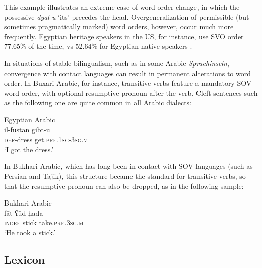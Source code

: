 \documentclass[output=paper]{langsci/langscibook}
\begin{document}

This example illustrates an extreme case of word order change, in which the possessive \textit{dyal-u} ‘its’ precedes the head. Overgeneralization of permissible (but sometimes pragmatically marked) word orders, however, occur much more frequently. Egyptian heritage speakers in the US, for instance, use SVO order 77.65\% of the time, vs 52.64\% for Egyptian native speakers \citep[280–281]{AlbiriniSaadah2011}.

In situations of stable bilingualism, such as in some Arabic \textit{Sprachinseln}, convergence with contact languages can result in permanent alterations to word order. In Buxari Arabic, for instance, transitive verbs feature a mandatory SOV word order, with optional resumptive pronoun after the verb. Cleft sentences such as the following one are quite common in all Arabic dialects:

\ea\label{ex:key:}
{Egyptian Arabic \citep[145]{Ratcliffe2005}}\\
\gll il-fustān  gibt-u\\
     \textsc{def-}dress  get.\textsc{prf.1sg-3sg.m}\\
\glt ‘I got the dress.’
\z

In Bukhari Arabic, which has long been in contact with SOV languages (such as Persian and Tajik), this structure became the standard for transitive verbs, so that the resumptive pronoun can also be dropped, as in the following sample:

\ea\label{ex:key:}
{Bukhari Arabic  \citep[144]{Ratcliffe2005}}\\
\gll   fāt ʕūd ḫada\\
       \textsc{indef} stick take\textsc{.prf.3sg.m}\\
\glt ‘He took a stick.’
\z


 
 \subsection{Lexicon}
\end{document}
